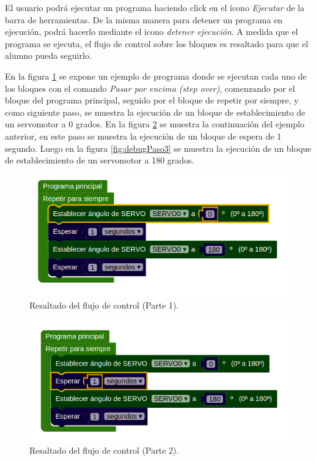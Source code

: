 El usuario podrá ejecutar un programa haciendo click en el ícono \emph{Ejecutar} de la barra de herramientas. De la misma manera para detener un programa en ejecución, podrá hacerlo mediante el icono \emph{detener ejecución}.
A medida que el programa se ejecuta, el flujo de control sobre los bloques es resaltado para que el alumno pueda seguirlo. 

En la figura \ref{fig:debugPaso1} se expone un ejemplo de programa donde se ejecutan cada uno de los bloques con el comando  \emph{Pasar por encima (step over)}, comenzando por el bloque del programa principal, seguido por el bloque de repetir por siempre, y como siguiente paso, se muestra la ejecución de un bloque de establecimiento de un servomotor a 0 grados. En la figura \ref{fig:debugPaso2} se muestra la continuación del ejemplo anterior, en este paso se
muestra la ejecución de un bloque de espera de 1 segundo. Luego en la figura \ref{fig:debugPaso3} se
muestra la ejecución de un bloque de establecimiento de un servomotor a 180 grados.


\begin{figure}[!htbp]
	\begin{center}  %
		\includegraphics[scale=.60]{./Figures/debugPaso1.PNG}
		\par\caption{Resaltado del flujo de control (Parte 1).}\label{fig:debugPaso1}
	\end{center}
\end{figure}

\begin{figure}[!htbp]
	\begin{center}  %
		\includegraphics[scale=.60]{./Figures/debugPaso2.PNG}
		\par\caption{Resaltado del flujo de control (Parte 2).}\label{fig:debugPaso2}
	\end{center}
\end{figure}

